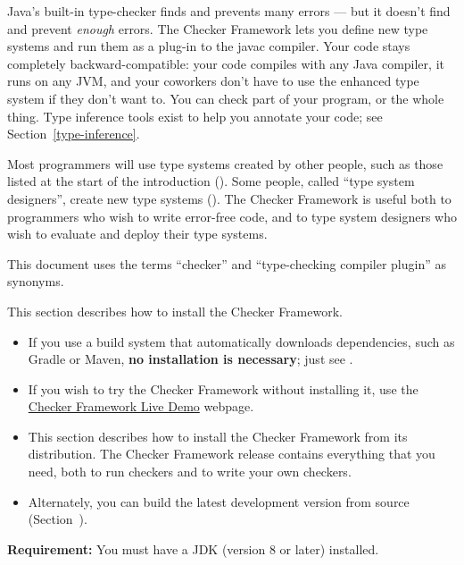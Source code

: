 
Java's built-in type-checker finds and prevents many errors --- but it
doesn't find and prevent \emph{enough} errors.  The Checker Framework lets you
define new type systems and run them as a plug-in to the javac compiler.  Your
code stays completely backward-compatible:  your code compiles with any
Java compiler, it runs on any JVM, and your coworkers don't have to use the
enhanced type system if they don't want to.  You can check part of
your program, or the whole thing.  Type inference tools exist to help you annotate your
code; see Section~\ref{type-inference}.

Most programmers will use type systems created by other people, such as
those listed at the start of the introduction ().
Some people, called ``type system designers'', create new type systems
().
The Checker Framework is useful both to programmers who
wish to write error-free code, and to type system designers who wish to
evaluate and deploy their type systems.

This document uses the terms ``checker'' and ``type-checking compiler
plugin'' as synonyms.


This section describes how to install the Checker Framework.
\begin{itemize}
\item
If you use a build system that automatically downloads dependencies,
such as Gradle or Maven, \textbf{no installation is necessary}; just see
.
\item
If you wish to try the Checker Framework without installing it, use the
\href{http://eisop.uwaterloo.ca/live/}{Checker Framework Live Demo} webpage.
\item
This section describes how to install the Checker Framework from its
distribution.  The Checker Framework release contains everything that you
need, both to run checkers and to write your own checkers.
\item
Alternately, you can build the latest development version from source
(Section~).
\end{itemize}


\textbf{Requirement:}
You must have a JDK (version 8 or later) installed.

